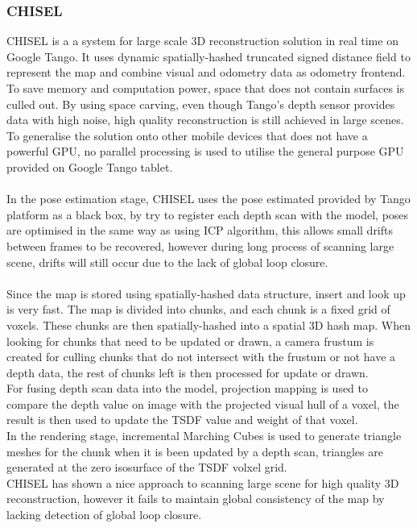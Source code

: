 \documentclass[12pt,twoside]{article}
\begin{document}
\subsubsection{CHISEL}
CHISEL\citep{klingensmith2015chisel} is a a system for large scale 3D reconstruction solution in real time on Google Tango. It uses dynamic spatially-hashed truncated signed distance field\citep{niessner2013real} to represent the map and combine visual and odometry data as odometry frontend. To save memory and computation power, space that does not contain surfaces is culled out. By using space carving, even though Tango's depth sensor provides data with high noise, high quality reconstruction is still achieved in large scenes. To generalise the solution onto other mobile devices that does not have a powerful GPU, no parallel processing is used to utilise the general purpose GPU provided on Google Tango tablet.\\
\\
In the pose estimation stage, CHISEL uses the pose estimated provided by Tango platform as a black box, by try to register each depth scan with the model, poses are optimised in the same way as using ICP algorithm, this allows small drifts between frames to be recovered, however during long process of scanning large scene, drifts will still occur due to the lack of global loop closure.\\
\\
Since the map is stored using spatially-hashed data structure, insert and look up is  very fast. The map is divided into chunks, and each chunk is a fixed grid of voxels. These chunks are then spatially-hashed into a spatial 3D hash map. When looking for chunks that need to be updated or drawn, a camera frustum is created for culling chunks that do not intersect with the frustum or not have a depth data, the rest of chunks left is then processed for update or drawn.
\\
For fusing depth scan data into the model, projection mapping is used to compare the depth value on image with the projected visual hull of a voxel, the result is then used to update the TSDF value and weight of that voxel.
\\
In the rendering stage, incremental Marching Cubes is used to generate triangle meshes for the chunk when it is been updated by a depth scan, triangles are generated at the zero isosurface of the TSDF volxel grid.\\
CHISEL has shown a nice approach to scanning large scene for high quality 3D reconstruction, however it fails to maintain global consistency of the map by lacking detection of global loop closure. 
\end{document}
